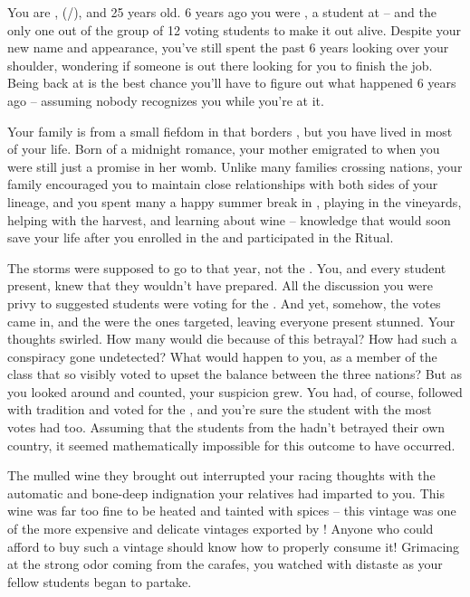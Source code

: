\documentclass[char]{GL2020}
\begin{document}
\name{\cAssistantScientist{}}

You are \cAssistantScientist{}, (\cAssistantScientist{\they}/\cAssistantScientist{\them}), and 25 years old. 6 years ago you were \cKidScientist{}, a student at \pSc{} -- and the only one out of the group of 12 voting students to make it out alive. Despite your new name and appearance, you've still spent the past 6 years looking over your shoulder, wondering if someone is out there looking for you to finish the job. Being back at \pSc{} is the best chance you'll have to figure out what happened 6 years ago -- assuming nobody recognizes you while you're at it.

Your family is from a small fiefdom in \pFarm{} that borders \pTech{}, but you have lived in \pTech{} most of your life. Born of a midnight romance, your mother emigrated to \pTech{} when you were still just a promise in her womb. Unlike many families crossing nations, your family encouraged you to maintain close relationships with both sides of your lineage, and you spent many a happy summer break in \pFarm{}, playing in the vineyards, helping with the harvest, and learning about wine -- knowledge that would soon save your life after you enrolled in the \pSc{} and participated in the Ritual.

The storms were supposed to go to \pTech{} that year, not the \pShip{}. You, and every student present, knew that they wouldn’t have prepared. All the discussion you were privy to suggested students were voting for the \pTech{}. And yet, somehow, the votes came in, and the \pShip{} were the ones targeted, leaving everyone present stunned. Your thoughts swirled. How many would die because of this betrayal? How had such a conspiracy gone undetected? What would happen to you, as a member of the class that so visibly voted to upset the balance between the three nations? But as you looked around and counted, your suspicion grew.  You had, of course, followed with tradition and voted for the \pTech{}, and you’re sure the \pFarm{} student with the most votes had too. Assuming that the students from the \pShip{} hadn’t betrayed their own country, it seemed mathematically impossible for this outcome to have occurred.

The mulled wine they brought out interrupted your racing thoughts with the automatic and bone-deep indignation your \pFarm{} relatives had imparted to you. This wine was far too fine to be heated and tainted with spices -- this vintage was one of the more expensive and delicate vintages exported by \pFarm{}! Anyone who could afford to buy such a vintage should know how to properly consume it! Grimacing at the strong odor coming from the carafes, you watched with distaste as your fellow students began to partake.
\end{document}
